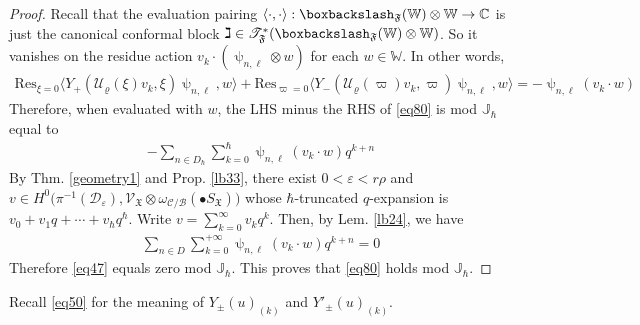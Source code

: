 \documentclass[11pt,b5paper,notitlepage]{article}
\theoremstyle{definition}
\theoremstyle{plain}
\newcommand{\Res}{\mathrm{Res}}
\newcommand{\SV}{\mathscr{V}}
\newcommand{\mbb}{\mathbb}
\newcommand{\blt}{\bullet}
\newcommand{\Wbb}{\mathbb W}
\newcommand{\Cbb}{\mathbb C}
\newcommand{\<}{\left\langle}
\renewcommand{\>}{\right\rangle}
\newcommand{\MU}{\mathcal{U}}
\newcommand{\MC}{\mathcal{C}}
\newcommand{\MB}{\mathcal{B}}
\newcommand{\fx}{\mathfrak{X}}
\newcommand{\ST}{\mathscr{T}}
\newcommand{\MD}{\mathcal{D}}
\newcommand{\bk}[1]{\langle {#1}\rangle}
\newcommand{\bbs}{\boxbackslash}
\newcommand{\eps}{\varepsilon}
\newcommand{\ff}{\mathfrak{F}}
\numberwithin{equation}{section}
\begin{document}
\begin{proof}
Recall that the evaluation pairing $\bk{\cdot,\cdot}:\bbs_\ff(\Wbb)\otimes \Wbb\rightarrow\Cbb$ is just the canonical conformal block $\gimel\in\ST^*_\ff(\bbs_\ff(\Wbb)\otimes\Wbb)$. So it vanishes on the residue action $v_k\cdot(\uppsi_{n,\ell}\otimes w)$ for each $w\in \Wbb$. In other words,
   \begin{align*}
    \Res_{\xi=0}\bk{Y_+(\MU_\varrho(\xi)v_k,\xi)\uppsi_{n,\ell},w}+\Res_{\varpi=0}\bk{Y_-(\MU_\varrho(\varpi)v_k,\varpi)\uppsi_{n,\ell},w}=-\uppsi_{n,\ell}(v_k\cdot w)
   \end{align*}
Therefore, when evaluated with $w$, the LHS minus the RHS of \eqref{eq80} is mod $\mbb J_\hbar$ equal to
\begin{align}\label{eq47}
-\sum_{n\in D_\hbar}\sum_{k=0}^\hbar \uppsi_{n,\ell}(v_k\cdot w)q^{k+n}
\end{align}
By Thm. \ref{geometry1} and Prop. \ref{lb33}, there exist $0<\eps<r\rho$ and $v\in H^0\big(\pi^{-1}(\MD_\eps),\SV_\fx\otimes \omega_{\MC/\MB}(\blt S_\fx)\big)$ whose $\hbar$-truncated $q$-expansion is $v_0+v_1q+\cdots+v_\hbar q^\hbar$. Write $v=\sum_{k=0}^\infty v_kq^k$. Then, by Lem. \ref{lb24}, we have
\begin{align*}
\sum_{n\in D}\sum_{k=0}^{+\infty}\uppsi_{n,\ell}(v_k\cdot w)q^{k+n}=0
\end{align*}
Therefore \eqref{eq47} equals zero mod $\mbb J_\hbar$. This proves that \eqref{eq80} holds mod $\mbb J_\hbar$.
\end{proof}



Recall \eqref{eq50} for the meaning of $Y_\pm(u)_{(k)}$ and $Y'_\pm(u)_{(k)}$.
\end{document}
